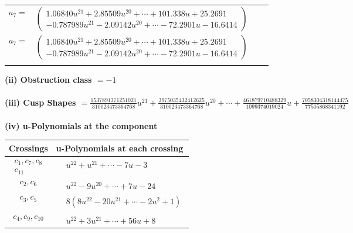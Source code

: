 \documentclass[1p]{elsarticle_modified}
\theoremstyle{definition}
\begin{document}
\begin{tabular}{m{7pt} m{180pt} m{7pt} m{180pt} }
\flushright $a_{7}=$&$\begin{pmatrix}1.06840 u^{21}+2.85509 u^{20}+\cdots+101.338 u+25.2691\\-0.787989 u^{21}-2.09142 u^{20}+\cdots-72.2901 u-16.6414\end{pmatrix}$\\ \flushright $a_{7}=$&$\begin{pmatrix}1.06840 u^{21}+2.85509 u^{20}+\cdots+101.338 u+25.2691\\-0.787989 u^{21}-2.09142 u^{20}+\cdots-72.2901 u-16.6414\end{pmatrix}$\\&\end{tabular}
\flushleft \textbf{(ii) Obstruction class $= -1$}\\~\\
\flushleft \textbf{(iii) Cusp Shapes $= \frac{1537891371251021}{310023473364768} u^{21}+\frac{3975035432412625}{310023473364768} u^{20}+\cdots+\frac{461879710488329}{1099374019024} u+\frac{7058304318144475}{77505868341192}$}\\~\\
\newpage\renewcommand{\arraystretch}{1}
\flushleft \textbf{(iv) u-Polynomials at the component}\newline \\
\begin{tabular}{m{50pt}|m{274pt}}
Crossings & \hspace{64pt}u-Polynomials at each crossing \\
\hline $$\begin{aligned}c_{1},c_{7},c_{8}\\c_{11}\end{aligned}$$&$\begin{aligned}
&u^{22}+u^{21}+\cdots-7 u-3
\end{aligned}$\\
\hline $$\begin{aligned}c_{2},c_{6}\end{aligned}$$&$\begin{aligned}
&u^{22}-9 u^{20}+\cdots+7 u-24
\end{aligned}$\\
\hline $$\begin{aligned}c_{3},c_{5}\end{aligned}$$&$\begin{aligned}
&8(8 u^{22}-20 u^{21}+\cdots-2 u^2+1)
\end{aligned}$\\
\hline $$\begin{aligned}c_{4},c_{9},c_{10}\end{aligned}$$&$\begin{aligned}
&u^{22}+3 u^{21}+\cdots+56 u+8
\end{aligned}$\\
\hline
\end{tabular}\\~\\
\end{document}
